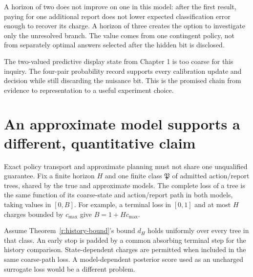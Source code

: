 \documentclass[11pt,oneside,openany]{book}
\theoremstyle{definition}\newtheorem{definition}[theorem]{Definition}
\begin{document}
A horizon of two does not improve on one in this model: after the first result, paying for one additional report does not lower expected classification error enough to recover its charge. A horizon of three creates the option to investigate only the unresolved branch. The value comes from one contingent policy, not from separately optimal answers selected after the hidden bit is disclosed.



The two-valued predictive display state from Chapter 1 is too coarse for this inquiry. The four-pair probability record supports every calibration update and decision while still discarding the nuisance bit. This is the promised chain from evidence to representation to a useful experiment choice.

\section{An approximate model supports a different, quantitative claim}
Exact policy transport and approximate planning must not share one unqualified guarantee. Fix a finite horizon $H$ and one finite class $\mathfrak P$ of admitted action/report trees, shared by the true and approximate models. The complete loss of a tree is the same function of its coarse-state and action/report path in both models, taking values in $[0,B]$. For example, a terminal loss in $[0,1]$ and at most $H$ charges bounded by $c_{\max}$ give $B=1+Hc_{\max}$.

Assume Theorem~\ref{r:history-bound}'s bound $d_H$ holds uniformly over every tree in that class. An early stop is padded by a common absorbing terminal step for the history comparison. State-dependent charges are permitted when included in the same coarse-path loss. A model-dependent posterior score used as an uncharged surrogate loss would be a different problem.
\end{document}
